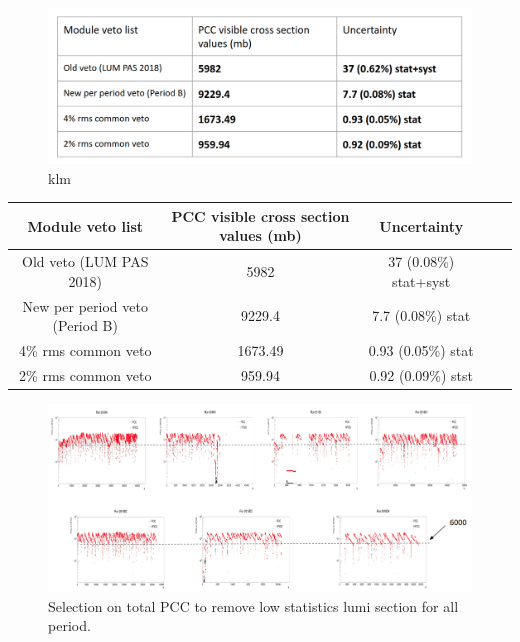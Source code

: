 \begin{figure}[!htp]
\centering
\includegraphics[width=1\textwidth]{ashish_thesis/sigmavis_diff_veto.png}
\caption{%
   klm
}
\label{fig:sigmavis_diff_veto}
\end{figure}

\begin{table}[!ht]
\centering
{}
\begin{tabular}{ccccc}
    \textbf{Module veto list} & \textbf{PCC visible cross section values (mb)} & \textbf{Uncertainty} \\ \hline
    Old veto (LUM PAS 2018) & 5982 & 37 (0.08\%) stat+syst \\
    New per period veto (Period B) & 9229.4  & 7.7 (0.08\%) stat \\
    4\% rms common veto & 1673.49  & 0.93 (0.05\%) stat \\
    2\% rms common veto & 959.94  & 0.92 (0.09\%) stst \\
\end{tabular}
\label{tab:pccvis_diffveto}
\end{table}



\begin{figure}[!htp]
\centering
\includegraphics[width=1\textwidth]{ashish_thesis/sys_unc_totPCC_cut.png}
\caption{%
   Selection on total PCC to remove low statistics lumi section for all period.
}
\label{fig:totpcccut_sys_unc}
\end{figure}



